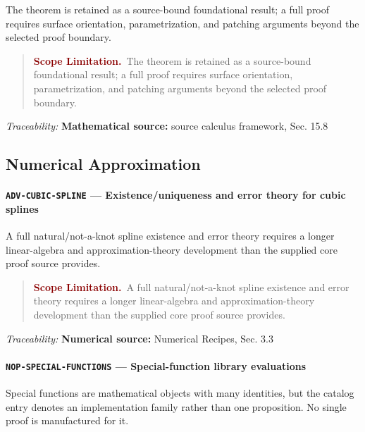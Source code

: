\documentclass[10pt]{article}
\newcommand{\pidraw}[1]{\begingroup\urlstyle{tt}\nolinkurl{#1}\endgroup}
\theoremstyle{definition}
\theoremstyle{remark}
\newenvironment{scopelimitation}
{\begin{quote}\small\noindent\textbf{\textcolor{darkred}{Scope Limitation.}}\ }
{\end{quote}}
\begin{document}
The theorem is retained as a source-bound foundational result; a full proof requires surface orientation, parametrization, and patching arguments beyond the selected proof boundary.

\begin{scopelimitation}The theorem is retained as a source-bound foundational result; a full proof requires surface orientation, parametrization, and patching arguments beyond the selected proof boundary.\end{scopelimitation}

\smallskip\noindent\textit{Traceability:} \textbf{Mathematical source:} source calculus framework, Sec. 15.8\par

\subsection{Numerical Approximation}

\label{prf:ADV-CUBIC-SPLINE}

\paragraph{\pidraw{ADV-CUBIC-SPLINE} --- Existence/uniqueness and error theory for cubic splines}

A full natural/not-a-knot spline existence and error theory requires a longer linear-algebra and approximation-theory development than the supplied core proof source provides.

\begin{scopelimitation}A full natural/not-a-knot spline existence and error theory requires a longer linear-algebra and approximation-theory development than the supplied core proof source provides.\end{scopelimitation}

\smallskip\noindent\textit{Traceability:} \textbf{Numerical source:} Numerical Recipes, Sec. 3.3\par

\label{prf:NOP-SPECIAL-FUNCTIONS}

\paragraph{\pidraw{NOP-SPECIAL-FUNCTIONS} --- Special-function library evaluations}

Special functions are mathematical objects with many identities, but the catalog entry denotes an implementation family rather than one proposition. No single proof is manufactured for it.
\end{document}
